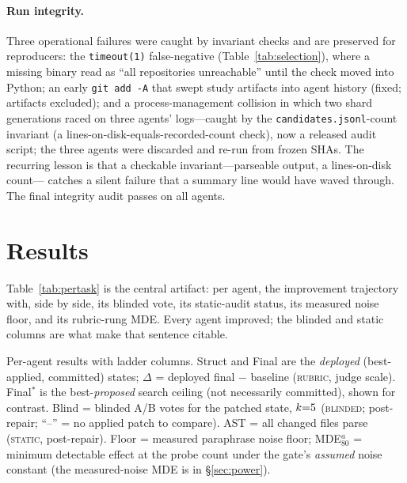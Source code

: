 \documentclass[11pt]{article}
\begin{document}
\paragraph{Run integrity.}
Three operational failures were caught by invariant checks and are preserved
for reproducers: the \texttt{timeout(1)} false-negative
(Table~\ref{tab:selection}), where a missing binary read as ``all repositories
unreachable'' until the check moved into Python; an early \texttt{git add -A}
that swept study artifacts into agent history (fixed; artifacts excluded); and
a process-management collision in which two shard generations raced on three
agents' logs---caught by the \texttt{candidates.jsonl}-count invariant (a
lines-on-disk-equals-recorded-count check), now a released audit script; the
three agents were discarded and re-run from frozen SHAs. The recurring lesson
is that a checkable invariant---parseable output, a lines-on-disk count---
catches a silent failure that a summary line would have waved through. The
final integrity audit passes on all \swN{} agents.

\section{Results}
\label{sec:results}
Table~\ref{tab:pertask} is the central artifact: per agent, the improvement
trajectory with, side by side, its blinded vote, its static-audit status, its
measured noise floor, and its rubric-rung MDE. Every agent improved; the
blinded and static columns are what make that sentence citable.

\begin{table}[p]\centering
\caption{Per-agent results with ladder columns. Struct and Final are the
\emph{deployed} (best-applied, committed) states; $\Delta$ = deployed final $-$
baseline (\textsc{rubric}, judge scale). Final$^{\ast}$ is the best-\emph{proposed}
search ceiling (not necessarily committed), shown for contrast. Blind = blinded
A/B votes for the patched state, $k{=}\swBlindK$ (\textsc{blinded}; post-repair;
``--'' = no applied patch to compare). AST \checkmark{} = all changed files parse
(\textsc{static}, post-repair). Floor = measured paraphrase noise floor;
MDE$^{a}_{80}$ = minimum detectable effect at the probe count under the gate's
\emph{assumed} noise constant (the measured-noise MDE is in \S\ref{sec:power}).}
\label{tab:pertask}
\footnotesize
\setlength{\tabcolsep}{3pt}
\begin{adjustbox}{max width=\linewidth,center}\end{adjustbox}
\end{table}
\end{document}
